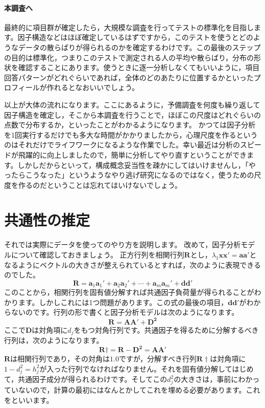 \documentclass{ltjsbook}
\begin{document}
\paragraph{本調査へ}最終的に項目群が確定したら，大規模な調査を行ってテストの標準化を目指します。因子構造などはほぼ確定しているはずですから，このテストを使うとどのようなデータの散らばりが得られるのかを確定するわけです。この最後のステップの目的は標準化，つまりこのテストで測定される人の平均や散らばり，分布の形状を確認することにあります。使うときに逐一分析しなくてもいいように，項目回答パターンがどれぐらいであれば，全体のどのあたりに位置するかといったプロフィールが作れるとなおいいでしょう。

以上が大体の流れになります。ここにあるように，予備調査を何度も繰り返して因子構造を確定し，そこから本調査を行うことで，ほぼこの尺度はどれぐらいの点数で分布するか，といったことがわかるようになります。
かつては因子分析を1回実行するだけでも多大な時間がかかりましたから，心理尺度を作るというのはそれだけでライフワークになるような作業でした。幸い最近は分析のスピードが飛躍的に向上しましたので，簡単に分析してやり直すということができます。しかしだからといって，構成概念妥当性を疎かにしてはいけませんし，「やったらこうなった」というようなやり逃げ研究になるのではなく，使うための尺度を作るのだということは忘れてはいけないでしょう。

\section{共通性の推定}

それでは実際にデータを使ってのやり方を説明します。
改めて，因子分析モデルについて確認しておきましょう。
正方行列を相関行列$\bm{R}$とし，$\lambda_1 \bm{xx'} = \bm{aa'}$となるようにベクトルの大きさが整えられているとすれば，次のように表現できるのでした。
\begin{equation}
	\bm{R}=\bm{a}_1\bm{a}_1'+\bm{a}_2\bm{a}_2'+\cdots +\bm{a}_m\bm{a}_m'+\bm{d} \bm{d}'
\end{equation}
このことから，相関行列を固有値分解すれば共通因子負荷量が得られることがわかります。しかしこれには1つ問題があります。この式の最後の項目，$\bm{d} \bm{d}'$がわからないのです。行列の形で書くと因子分析モデルは次のようになります。
\[
	\bm{R} = \bm{AA'}+\bm{D^2}
\]
ここで$\bm{D}$は対角項に$d_j$をもつ対角行列です。共通因子を得るために分解するべき行列は，次のようになります。
\[
	\bm{R}\dagger = \bm{R}-\bm{D^2} = \bm{AA'}
\]
$\bm{R}$は相関行列であり，その対角は$1.0$ですが，分解すべき行列$\bm{R}\dagger$は対角項に$1-d_j^2=h_j^2$が入った行列でなければなりません。それを固有値分解してはじめて，共通因子成分が得られるわけです。そしてこの$d_j^2$の大きさは，事前にわかっていないので，計算の最初にはなんとかしてこれを埋める必要があります。これをといいます。
\end{document}
